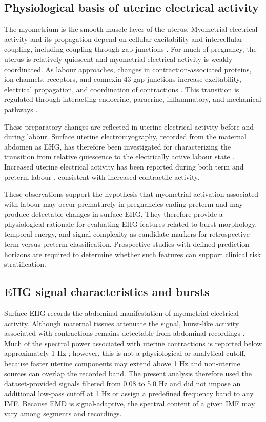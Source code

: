\documentclass[10pt,letterpaper]{article}
\begin{document}
\subsection*{Physiological basis of uterine electrical activity}
The myometrium is the smooth-muscle layer of the uterus. Myometrial electrical activity and its propagation depend on cellular excitability and intercellular coupling, including coupling through gap junctions \cite{GarfieldSims1977,Aguilar2010}. For much of pregnancy, the uterus is relatively quiescent and myometrial electrical activity is weakly coordinated. As labour approaches, changes in contraction-associated proteins, ion channels, receptors, and connexin-43 gap junctions increase excitability, electrical propagation, and coordination of contractions \cite{Aguilar2010, garfield1998control}. This transition is regulated through interacting endocrine, paracrine, inflammatory, and mechanical pathways \cite{garfield1998control, garfield1993control}.

These preparatory changes are reflected in uterine electrical activity before and during labour. Surface uterine electromyography, recorded from the maternal abdomen as EHG, has therefore been investigated for characterizing the transition from relative quiescence to the electrically active labour state \cite{garfield1998control}. Increased uterine electrical activity has been reported during both term and preterm labour \cite{wolfs1979electromyographic, csapo1981force}, consistent with increased contractile activity.

These observations support the hypothesis that myometrial activation associated with labour may occur prematurely in pregnancies ending preterm and may produce detectable changes in surface EHG. They therefore provide a physiological rationale for evaluating EHG features related to burst morphology, temporal energy, and signal complexity as candidate markers for retrospective term-versus-preterm classification. Prospective studies with defined prediction horizons are required to determine whether such features can support clinical risk stratification.

\subsection*{EHG signal characteristics and bursts}

Surface EHG records the abdominal manifestation of myometrial electrical activity. Although maternal tissues attenuate the signal, burst-like activity associated with contractions remains detectable from abdominal recordings \cite{Buhimschi1997,GarfieldManer2007}. Much of the spectral power associated with uterine contractions is reported below approximately 1 Hz \cite{Devedeux1993}; however, this is not a physiological or analytical cutoff, because faster uterine components may extend above 1 Hz and non-uterine sources can overlap the recorded band. The present analysis therefore used the dataset-provided signals filtered from 0.08 to 5.0 Hz and did not impose an additional low-pass cutoff at 1 Hz or assign a predefined frequency band to any IMF. Because EMD is signal-adaptive, the spectral content of a given IMF may vary among segments and recordings.
\end{document}
